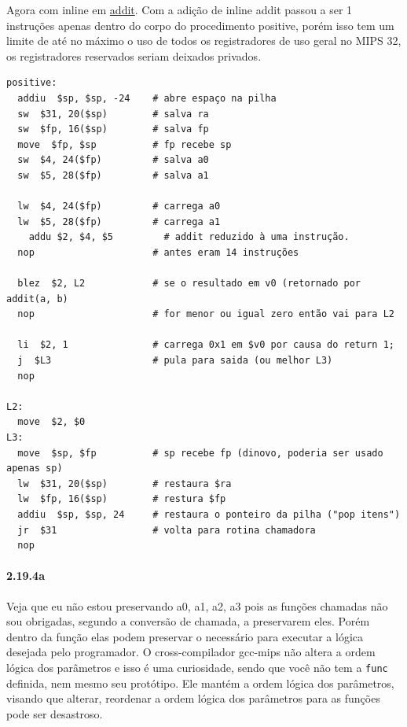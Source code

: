 \documentclass{article}
\begin{document}
Agora com inline em \underline{addit}. Com a adição de inline addit passou a
ser 1 instruções apenas dentro do corpo do procedimento positive, porém isso
tem um limite de até no máximo o uso de todos os registradores de uso geral no
MIPS 32, os registradores reservados seriam deixados privados.

\begin{verbatim}
positive:
  addiu  $sp, $sp, -24    # abre espaço na pilha
  sw  $31, 20($sp)        # salva ra
  sw  $fp, 16($sp)        # salva fp
  move  $fp, $sp          # fp recebe sp
  sw  $4, 24($fp)         # salva a0
  sw  $5, 28($fp)         # salva a1

  lw  $4, 24($fp)         # carrega a0
  lw  $5, 28($fp)         # carrega a1
	addu $2, $4, $5         # addit reduzido à uma instrução.
  nop                     # antes eram 14 instruções

  blez  $2, L2            # se o resultado em v0 (retornado por addit(a, b)
  nop                     # for menor ou igual zero então vai para L2

  li  $2, 1               # carrega 0x1 em $v0 por causa do return 1;
  j  $L3                  # pula para saida (ou melhor L3)
  nop

L2:
  move  $2, $0
L3:
  move  $sp, $fp          # sp recebe fp (dinovo, poderia ser usado apenas sp)
  lw  $31, 20($sp)        # restaura $ra
  lw  $fp, 16($sp)        # restura $fp
  addiu  $sp, $sp, 24     # restaura o ponteiro da pilha ("pop itens")
  jr  $31                 # volta para rotina chamadora
  nop
\end{verbatim}

\paragraph{2.19.4a}

Veja que eu não estou preservando a0, a1, a2, a3 pois as funções chamadas não
sou obrigadas, segundo a conversão de chamada, a preservarem eles. Porém dentro
da função elas podem preservar o necessário para executar a lógica desejada
pelo programador. O cross-compilador gcc-mips não altera a ordem lógica dos
parâmetros e isso é uma curiosidade, sendo que você não tem a \verb|func|
definida, nem mesmo seu protótipo. Ele mantém a ordem lógica dos parâmetros,
visando que alterar, reordenar a ordem lógica dos parâmetros para as funções
pode ser desastroso.
\end{document}
